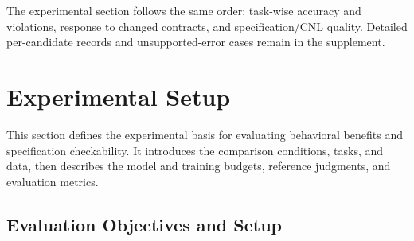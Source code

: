 \documentclass[nolineno]{ieeeaccess}
\begin{document}
The experimental section follows the same order: task-wise accuracy and violations, response to changed contracts, and specification/CNL quality. Detailed per-candidate records and unsupported-error cases remain in the supplement.\par

\section{Experimental Setup}\label{sec:experimental-setup}


This section defines the experimental basis for evaluating behavioral benefits and specification checkability. It introduces the comparison conditions, tasks, and data, then describes the model and training budgets, reference judgments, and evaluation metrics.\par

\subsection{Evaluation Objectives and Setup}
\end{document}
